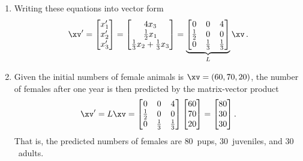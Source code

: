 \begin{example}
\begin{solution}
\begin{enumerate}
\item Writing these equations into vector form
\begin{equation*}
\xv'=\begin{bmatrix} x'_1\\x'_2\\x'_3 \end{bmatrix}
=\begin{bmatrix} 4x_3\\\frac12x_1\\\frac13x_2+\frac13x_3 \end{bmatrix}
=\underbrace{\begin{bmatrix} 0&0&4\\\frac12&0&0\\0&\frac13&\frac13 \end{bmatrix}}_L\xv\,.
\end{equation*}

\item Given the initial numbers of female animals is \(\xv=(60,70,20)\), the number of females after one year is then predicted by the matrix-vector product 
\begin{equation*}
\xv'=L\xv=\begin{bmatrix} 0&0&4\\\frac12&0&0\\0&\frac13&\frac13 \end{bmatrix}
\begin{bmatrix} 60\\70\\20 \end{bmatrix}
=\begin{bmatrix} 80\\30\\30 \end{bmatrix}.
\end{equation*}
That is, the predicted numbers of females are \(80\)~pups, \(30\)~juveniles, and \(30\)~adults.


\end{enumerate}
\end{solution}
\end{example}
